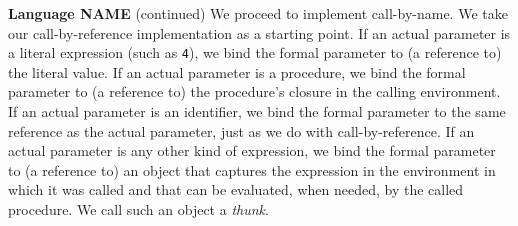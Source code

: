 \begin{minipage}[t]{\sw}
\slidenumber
\LARGE
{\bf Language NAME} (continued)\exx
We proceed to implement call-by-name.
We take our call-by-reference implementation as a starting point.\exx
If an actual parameter is a literal expression (such as \verb'4'),
we bind the formal parameter to (a reference to) the literal value.
If an actual parameter is a procedure,
we bind the formal parameter
to (a reference to) the procedure's closure in the calling environment.
If an actual parameter is an identifier,
we bind the formal parameter
to the same reference as the actual parameter,
just as we do with call-by-reference.\exx
If an actual parameter is any other kind of expression,
we bind the formal parameter
to (a reference to) an object that captures the expression
in the environment in which it was called
and that can be evaluated, when needed, by the called procedure.
We call such an object a {\em thunk}.\exx
\end{minipage}

